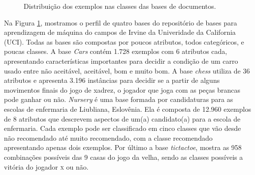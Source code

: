 \begin{figure}[!h]

\caption{Distribuição dos exemplos nas classes das bases de documentos.}
\label{fig::basesdoc}
\end{figure}

Na Figura \ref{fig::basesdoc}, mostramos o perfil de quatro bases do repositório de bases para aprendizagem de máquina do campos de Irvine da Univeridade da California (\textsc{UCI}). Todas as bases são compostas por poucos atributos, todos categóricos, e poucas classes. A base \textit{Cars} contém 1.728 exemplos com 6 atributos cada, apresentando características importantes para decidir a condição de um carro usado entre não aceitável, aceitável, bom e muito bom. A base \textit{chess} utiliza de 36 atributos e apresenta 3.196 instâncias para decidir se a partir de alguns movimentos finais do jogo de xadrez, o jogador que joga com as peças brancas pode ganhar ou não. \textit{Nursery} é uma base formada por candidaturas para as escolas de enfermaria de Liubliana, Eslovênia. Ela é composta de 12.960 exemplos de 8 atributos que descrevem aspectos de um(a) candidato(a) para a escola de enfermaria. Cada exemplo pode ser classificado em cinco classes que vão desde não recomendado até muito recomendado, com a classe recomendado apresentando apenas dois exemplos. Por último a base \textit{tictactoe}, mostra as 958 combinações possíveis das 9 casas do jogo da velha, sendo as classes possíveis a vitória do jogador \textsc{x} ou não.

